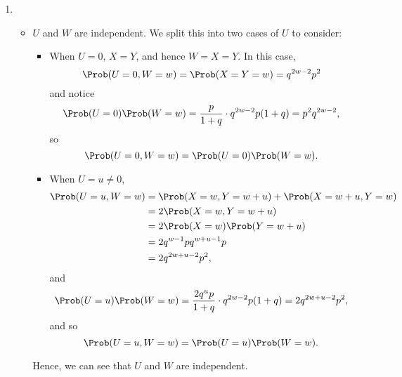 \begin{enumerate}
    \item \begin{itemize}
              \item \(U\) and \(W\) are independent. We split this into two cases of \(U\) to consider:
                    \begin{itemize}
                        \item When \(U = 0\), \(X = Y\), and hence \(W = X = Y\). In this case,
                              \[
                                  \Prob(U = 0, W = w) = \Prob(X = Y = w) = q^{2w - 2} p^2
                              \]
                              and notice
                              \[
                                  \Prob(U = 0) \Prob(W = w) = \frac{p}{1 + q} \cdot q^{2w - 2} p (1 + q) = p^2 q^{2w - 2},
                              \]
                              so
                              \[
                                  \Prob(U = 0, W = w) = \Prob(U = 0) \Prob(W = w).
                              \]

                        \item When \(U = u \neq 0\),
                              \begin{align*}
                                  \Prob(U = u, W = w) & = \Prob(X = w, Y = w + u) + \Prob(X = w + u, Y = w) \\
                                                      & = 2 \Prob(X = w, Y = w + u)                         \\
                                                      & = 2 \Prob(X = w) \Prob(Y = w + u)                   \\
                                                      & = 2 q^{w - 1} p q^{w + u - 1} p                     \\
                                                      & = 2 q^{2w + u - 2} p^2,
                              \end{align*}
                              and
                              \[
                                  \Prob(U = u) \Prob(W = w) = \frac{2 q^u p}{1 + q} \cdot q^{2w - 2} p (1 + q) = 2 q^{2w + u - 2} p^2,
                              \]
                              and so
                              \[
                                  \Prob(U = u, W = w) = \Prob(U = u) \Prob(W = w).
                              \]
                    \end{itemize}

                    Hence, we can see that \(U\) and \(W\) are independent.


\end{itemize}
\end{enumerate}
